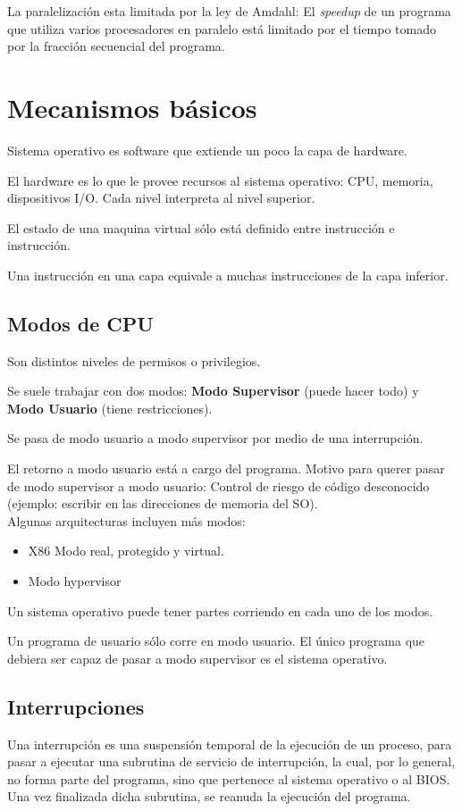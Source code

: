 \documentclass[a4paper, twoside]{article}
\begin{document}
La paralelización esta limitada por la ley de Amdahl: El \emph{speedup} de un programa que utiliza varios procesadores en paralelo está limitado por el tiempo tomado por la fracción secuencial del programa.

\newpage
\section{Mecanismos básicos}
Sistema operativo es software que extiende un poco la capa de hardware.

El hardware es lo que le provee recursos al sistema operativo: CPU, memoria, dispositivos I/O. Cada nivel interpreta al nivel superior.

El estado de una maquina virtual sólo está definido entre instrucción e instrucción.

Una instrucción en una capa equivale a muchas instrucciones de la capa inferior.

\subsection{Modos de CPU}
Son distintos niveles de permisos o privilegios.

Se suele trabajar con dos modos: \textbf{Modo Supervisor} (puede hacer todo) y \textbf{Modo Usuario} (tiene restricciones).

Se pasa de modo usuario a modo supervisor por medio de una interrupción. 

El retorno a modo usuario está a cargo del programa. Motivo para querer pasar de modo supervisor a modo usuario: Control de riesgo de código desconocido (ejemplo: escribir en las direcciones de memoria del SO).\\

Algunas arquitecturas incluyen más modos:
\begin{itemize}
	\item X86 Modo real, protegido y virtual.
	\item Modo hypervisor
\end{itemize}

Un sistema operativo puede tener partes corriendo en cada uno de los modos.

Un programa de usuario sólo corre en modo usuario. El único programa que debiera ser capaz de pasar a modo supervisor es el sistema operativo.

\subsection{Interrupciones}
Una interrupción es una suspensión temporal de la ejecución de un proceso, para pasar a ejecutar una subrutina de servicio de interrupción, la cual, por lo general, no forma parte del programa, sino que pertenece al sistema operativo o al BIOS. Una vez finalizada dicha subrutina, se reanuda la ejecución del programa.\\
\end{document}
